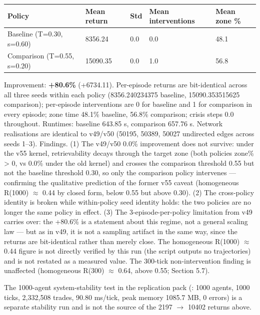 \documentclass[11pt]{article}
\begin{document}
\begin{table}[htbp]
\centering
\begin{tabular}{lllll}
\toprule
\textbf{Policy} & \textbf{Mean return} & \textbf{Std} & \textbf{Mean interventions} & \textbf{Mean zone \%} \\
\midrule
Baseline (T=0.30, s=0.60) & 8356.24 & 0.0 & 0.0 & 48.1 \\
Comparison (T=0.55, s=0.20) & 15090.35 & 0.0 & 1.0 & 56.8 \\
\bottomrule
\end{tabular}
\end{table}

Improvement: \textbf{+80.6\%} (+6734.11). Per-episode returns are bit-identical across all three seeds within each policy (8356.240234375 baseline, 15090.353515625 comparison); per-episode interventions are 0 for baseline and 1 for comparison in every episode; zone time 48.1\% baseline, 56.8\% comparison; crisis steps 0.0 throughout. Runtimes: baseline 643.85 s, comparison 657.76 s. Network realisations are identical to v49/v50 (50195, 50389, 50027 undirected edges across seeds 1--3). Findings. (1) The v49/v50 0.0\% improvement does not survive: under the v55 kernel, retrievability decays through the target zone (both policies zone\% > 0, vs 0.0\% under the old kernel) and crosses the comparison threshold 0.55 but not the baseline threshold 0.30, so only the comparison policy intervenes --- confirming the qualitative prediction of the former v55 caveat (homogeneous R(1000) $\approx$ 0.44 by closed form, below 0.55 but above 0.30). (2) The cross-policy identity is broken while within-policy seed identity holds: the two policies are no longer the same policy in effect. (3) The 3-episode-per-policy limitation from v49 carries over: the +80.6\% is a statement about this regime, not a general scaling law --- but as in v49, it is not a sampling artifact in the same way, since the returns are bit-identical rather than merely close. The homogeneous R(1000) $\approx$ 0.44 figure is not directly verified by this run (the script outputs no trajectories) and is not restated as a measured value. The 300-tick non-intervention finding is unaffected (homogeneous R(300) $\approx$ 0.64, above 0.55; Section 5.7).

The 1000-agent system-stability test in the replication pack (: 1000 agents, 1000 ticks, 2,332,508 trades, 90.80 ms/tick, peak memory 1085.7 MB, 0 errors) is a separate stability run and is not the source of the 2197 $\rightarrow$ 10402 returns above.
\end{document}
